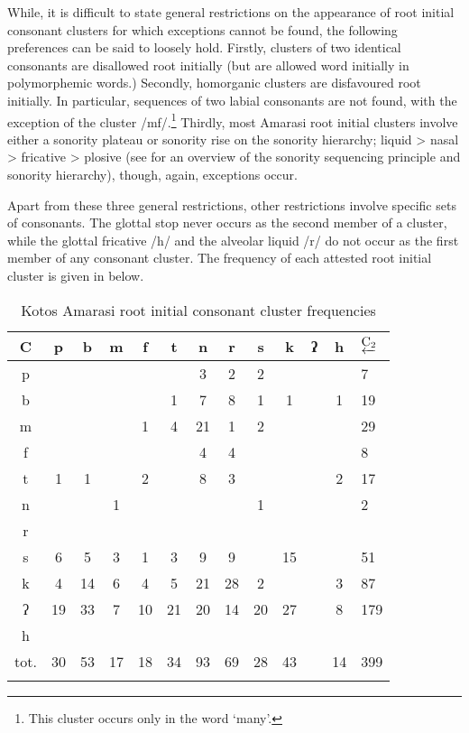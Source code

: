 While, it is difficult to state general restrictions on the appearance of root
initial consonant clusters for which exceptions cannot be found,
the following preferences can be said to loosely hold.
Firstly, clusters of two identical consonants are disallowed root initially
(but are allowed word initially in polymorphemic words.)
Secondly, homorganic clusters are disfavoured root initially.
In particular, sequences of two labial consonants are not found,
with the exception of the cluster /mf/.\footnote{
		This cluster occurs only in the word  `many'.}
Thirdly, most Amarasi root initial clusters involve either
a sonority plateau or sonority rise on the sonority hierarchy;
liquid {\textgreater} nasal {\textgreater} fricative {\textgreater} plosive
(see \citet[210f]{ble95} for an overview of the sonority sequencing principle and sonority hierarchy),
though, again, exceptions occur.

Apart from these three general restrictions, other restrictions involve specific sets of consonants.
The glottal stop never occurs as the second member of a cluster,
while the glottal fricative /h/ and the alveolar liquid /r/
do not occur as the first member of any consonant cluster.
The frequency of each attested root initial cluster
is given in  below.

\begin{table}[ht]
	\centering\caption{Kotos Amarasi root initial consonant cluster frequencies}\label{tab:AmaRooIniConCluFre}
		\begin{tabular}{c|ccccccccccc|l}\lsptoprule
			C\sub{1}{\da}
					&	p	&	b	&	m	&	f	&	t	&	n	&	r	&	s	&	k	&	ʔ	&	h	&	$\underleftarrow{\textrm{C\textsubscript{2}}}$\\ \midrule
				p	&		&		&		&		&		&	3	&	2	&	2	&		&		&		&	7\\
				b	&		&		&		&		&	1	&	7	&	8	&	1	&	1	&		&	1	&	19\\
				m	&		&		&		&	1	&	4	&	21	&	1	&	2	&		&		&		&	29\\
				f	&		&		&		&		&		&	4	&	4	&		&		&		&		&	8\\
				t	&	1	&	1	&		&	2	&		&	8	&	3	&		&		&		&	2	&	17\\
				n	&		&		&	1	&		&		&		&		&	1	&		&		&		&	2\\
				r	&		&		&		&		&		&		&		&		&		&		&		&	\\
				s	&	6	&	5	&	3	&	1	&	3	&	9	&	9	&		&	15	&		&		&	51\\
				k	&	4	&	14	&	6	&	4	&	5	&	21	&	28	&	2	&		&		&	3	&	87\\
				ʔ	&	19	&	33	&	7	&	10	&	21	&	20	&	14	&	20	&	27	&		&	8	&	179\\
				h	&		&		&		&		&		&		&		&		&		&		&		&	\\ \midrule
			tot.&	30	&	53	&	17	&	18	&	34	&	93	&	69	&	28	&	43	&		&	14	&	399\\\lspbottomrule
		\end{tabular}
\end{table}

